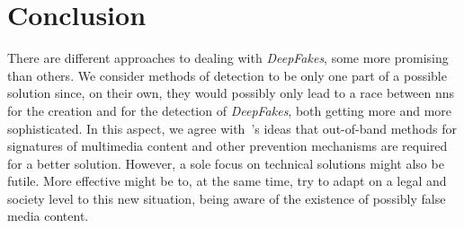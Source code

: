 \section{Conclusion}
There are different approaches to dealing with \textit{DeepFakes}, some more
promising than others. We consider methods of detection to be only one part of a
possible solution since, on their own, they would possibly only lead to a race
between \glspl{nn} for the creation and for the detection of \textit{DeepFakes},
both getting more and more sophisticated. In this aspect, we agree with~\textcite{Mirsky.2020}'s
ideas that out-of-band methods for signatures of multimedia content and other
prevention mechanisms are required for a better solution. However, a sole focus
on technical solutions might also be futile. More effective might be to, at the
same time, try to adapt on a legal and society level to this new situation,
being aware of the existence of possibly false media content.

